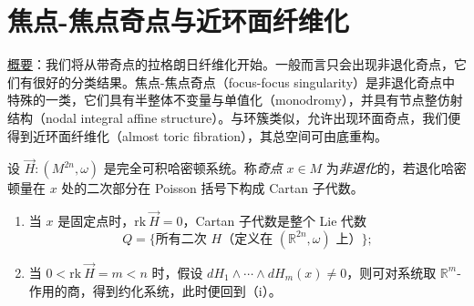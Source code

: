 
\section{焦点-焦点奇点与近环面纤维化}

\underline{概要}：我们将从带奇点的拉格朗日纤维化开始。一般而言只会出现非退化奇点，它们有很好的分类结果。焦点-焦点奇点（focus-focus singularity）是非退化奇点中特殊的一类，它们具有半整体不变量与单值化（monodromy），并具有节点整仿射结构（nodal integral affine structure）。与环簇类似，允许出现环面奇点，我们便得到近环面纤维化（almost toric fibration），其总空间可由底重构。

\begin{definition*}
设 $\vec{H}\colon (M^{2n},\omega)$ 是完全可积哈密顿系统。称\emph{奇点} $x\in M$ 为\emph{非退化}的，若退化哈密顿量在 $x$ 处的二次部分在 Poisson 括号下构成 Cartan 子代数。
\end{definition*}


\begin{enumerate}[leftmargin=1.9em,itemsep=1pt,topsep=2pt]
  \item[（i）] 当 $x$ 是固定点时，$\mathrm{rk}\ \vec{H}=0$，Cartan 子代数是整个 Lie 代数
  \[
    Q=\{\text{所有二次 }H\text{（定义在 }(\mathbb{R}^{2n},\omega)\text{ 上）}\};
  \]
  \item[（ii）] 当 $0<\mathrm{rk}\ \vec{H}=m < n$ 时，假设 $dH_1\wedge\dotsb\wedge dH_m (x)\neq 0$，则可对系统取 $\mathbb{R}^m$-作用的商，得到约化系统，此时便回到（i）。
\end{enumerate}




